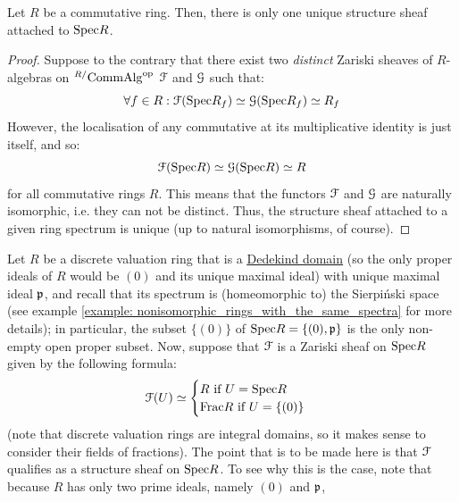             \begin{proposition} \label{prop: structure_sheaf_uniqueness}
                Let $R$ be a commutative ring. Then, there is only one unique structure sheaf attached to $\mathrm{Spec} R$. 
            \end{proposition}
                \begin{proof}
                    Suppose to the contrary that there exist two \textit{distinct} Zariski sheaves of $R$-algebras on ${}^{R/}\mathrm{Comm}\mathrm{Alg}^{\mathrm{op}}$ $\mathcal{F}$ and $\mathcal{G}$ such that:
                        $$\forall f \in R: \mathcal{F}(\mathrm{Spec} R_f) \simeq \mathcal{G}(\mathrm{Spec} R_f) \simeq R_f$$
                    However, the localisation of any commutative at its multiplicative identity is just itself, and so:
                        $$\mathcal{F}(\mathrm{Spec} R) \simeq \mathcal{G}(\mathrm{Spec} R) \simeq R$$
                    for all commutative rings $R$. This means that the functors $\mathcal{F}$ and $\mathcal{G}$ are naturally isomorphic, i.e. they can not be distinct. Thus, the structure sheaf attached to a given ring spectrum is unique (up to natural isomorphisms, of course).
                \end{proof}
                
            \begin{example}
                Let $R$ be a discrete valuation ring that is a \href{https://en.wikipedia.org/wiki/Dedekind_domain}{\underline{Dedekind domain}} (so the only proper ideals of $R$ would be $(0)$ and its unique maximal ideal) with unique maximal ideal $\mathfrak{p}$, and recall that its spectrum is (homeomorphic to) the Sierpi\'nski space (see example \ref{example: nonisomorphic_rings_with_the_same_spectra} for more details); in particular, the subset $\{(0)\}$ of $\mathrm{Spec} R = \{(0), \mathfrak{p}\}$ is the only non-empty open proper subset. Now, suppose that $\mathcal{F}$ is a Zariski sheaf on $\mathrm{Spec} R$ given by the following formula:
                    $$
                        \mathcal{F}(U) \simeq 
                        \begin{cases}
                            \text{$R$ if $U = \mathrm{Spec} R$}
                            \\
                            \text{$\mathrm{Frac} R$ if $U = \{(0)\}$}
                        \end{cases}
                    $$
                (note that discrete valuation rings are integral domains, so it makes sense to consider their fields of fractions). The point that is to be made here is that $\mathcal{F}$ qualifies as a structure sheaf on $\mathrm{Spec} R$. To see why this is the case, note that because $R$ has only two prime ideals, namely $(0)$ and $\mathfrak{p}$, 
            \end{example}
            
